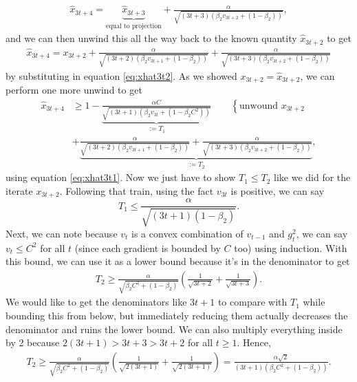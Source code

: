 \documentclass{article}
\newcommand{\1}{\mathbf{1}}                 %
\begin{document}
\begin{align*}
    \hat{x}_{3t+4} = \underbrace{\hat{x}_{3t+3}}_{\text{equal to projection}} + \frac{\alpha}{\sqrt{(3t+3)(\beta_2v_{3t+2}+(1-\beta_2))}},
\end{align*}
and we can then unwind this all the way back to the known quantity \(\hat{x}_{3t+2}\) to get 
\begin{align*}
    \hat{x}_{3t+4} = x_{3t+2} + \frac{\alpha}{\sqrt{(3t+2)(\beta_2 v_{3t+1}+(1-\beta_2))}} + 
    \frac{\alpha}{\sqrt{(3t+3)(\beta_2v_{3t+2}+(1-\beta_2))}}
\end{align*}
by substituting in equation \eqref{eq:xhat3t2}. As we showed \(x_{3t+2}=\hat{x}_{3t+2}\), we can perform one more unwind to get 
\begin{align*}
    \hat{x}_{3t+4} &\geq 
    1 -  \underbrace{\frac{\alpha C}{\sqrt{(3t+1)(\beta_2 v_{3t}+(1-\beta_2 C^2))}}}_{:=T_1}\qquad\left\{\text{unwound }x_{3t+2}\right. \\ 
    &+ \underbrace{\frac{\alpha}{\sqrt{(3t+2)(\beta_2 v_{3t+1}+(1-\beta_2))}} + 
    \frac{\alpha}{\sqrt{(3t+3)(\beta_2v_{3t+2}+(1-\beta_2))}}}_{:=T_2},
\end{align*}
using equation \eqref{eq:xhat3t1}. Now we just have to show \(T_1 \leq T_2\) like we did for the iterate \(x_{3t+2}\). Following that train, using the fact \(v_{3t}\) is positive, we can say 
\begin{equation}
 T_1 \leq \frac{\alpha}{\sqrt{(3t+1)(1-\beta_2)}}. \label{eq:T1}
\end{equation}
Next, we can note because \(v_t\) is a convex combination of \(v_{t-1}\) and \(g_t^2\), we can say \(v_{t}\leq C^2\) for all \(t\) (since each gradient is bounded by \(C\) too) using induction. With this bound, we can use it as a lower bound because it's in the denominator to get 
\begin{align*}
T_2  \geq \frac{\alpha}{\sqrt{\beta_2 C^2 + (1-\beta_2)}}\left(\frac{1}{\sqrt{3t+2}} + \frac{1}{\sqrt{3t+3}}\right).
\end{align*}
We would like to get the denominators like \(3t+1\) to compare with \(T_1\) while bounding this from below, but immediately reducing them actually decreases the denominator and ruins the lower bound. We can also multiply everything inside by 2 because \(2(3t+1)> 3t+3>3t+2\) for all \(t\geq 1\). Hence, 
\begin{align*}
T_2 \geq \frac{\alpha}{\sqrt{\beta_2 C^2 + (1-\beta_2)}}\left(\frac{1}{\sqrt{2(3t+1)}} + \frac{1}{\sqrt{2(3t+1)}}\right) = \frac{\alpha\sqrt{2}}{(3t+1)(\beta_2 C^2 + (1-\beta_2))}.
\end{align*}
\end{document}
